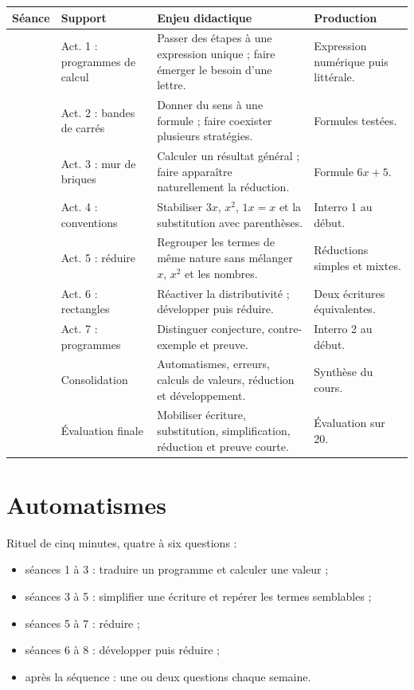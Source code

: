 \documentclass[12pt,a4paper]{article}
\begin{document}
\renewcommand{\arraystretch}{1.4}
\begin{tabularx}{\textwidth}{
|>{\centering\arraybackslash}p{1.1cm}
|>{\raggedright\arraybackslash}p{4cm}
|>{\raggedright\arraybackslash}X
|>{\raggedright\arraybackslash}p{3cm}|}
\hline
\textbf{Séance} & \textbf{Support} & \textbf{Enjeu didactique} & \textbf{Production}\\
\hline
1 & Act. 1 : programmes de calcul & Passer des étapes à une expression unique ; faire émerger le besoin d'une lettre. & Expression numérique puis littérale.\\
\hline
2 & Act. 2 : bandes de carrés & Donner du sens à une formule ; faire coexister plusieurs stratégies. & Formules testées.\\
\hline
3 & Act. 3 : mur de briques & Calculer un résultat général ; faire apparaître naturellement la réduction. & Formule \(6x+5\).\\
\hline
4 & Act. 4 : conventions & Stabiliser \(3x\), \(x^2\), \(1x=x\) et la substitution avec parenthèses. & Interro 1 au début.\\
\hline
5 & Act. 5 : réduire & Regrouper les termes de même nature sans mélanger \(x\), \(x^2\) et les nombres. & Réductions simples et mixtes.\\
\hline
6 & Act. 6 : rectangles & Réactiver la distributivité ; développer puis réduire. & Deux écritures équivalentes.\\
\hline
7 & Act. 7 : programmes & Distinguer conjecture, contre-exemple et preuve. & Interro 2 au début.\\
\hline
8 & Consolidation & Automatismes, erreurs, calculs de valeurs, réduction et développement. & Synthèse du cours.\\
\hline
9 & Évaluation finale & Mobiliser écriture, substitution, simplification, réduction et preuve courte. & Évaluation sur 20.\\
\hline
\end{tabularx}

\section*{Automatismes}

Rituel de cinq minutes, quatre à six questions :
\begin{itemize}
  \item séances 1 à 3 : traduire un programme et calculer une valeur ;
  \item séances 3 à 5 : simplifier une écriture et repérer les termes semblables ;
  \item séances 5 à 7 : réduire ;
  \item séances 6 à 8 : développer puis réduire ;
  \item après la séquence : une ou deux questions chaque semaine.
\end{itemize}
\end{document}

